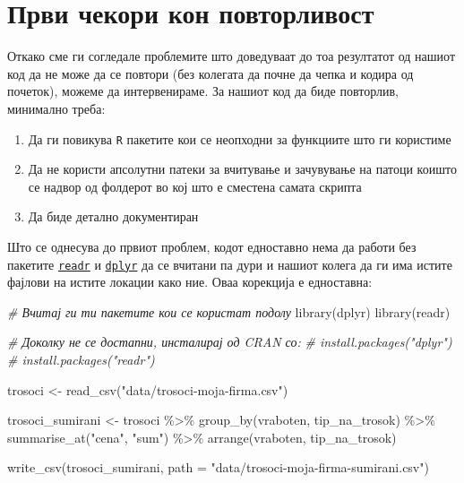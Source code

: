 \documentclass[
]{book}
\newenvironment{Shaded}{\begin{snugshade}}{\end{snugshade}}
\newcommand{\AttributeTok}[1]{\textcolor[rgb]{0.77,0.63,0.00}{#1}}
\newcommand{\CommentTok}[1]{\textcolor[rgb]{0.56,0.35,0.01}{\textit{#1}}}
\newcommand{\FunctionTok}[1]{\textcolor[rgb]{0.00,0.00,0.00}{#1}}
\newcommand{\NormalTok}[1]{#1}
\newcommand{\OtherTok}[1]{\textcolor[rgb]{0.56,0.35,0.01}{#1}}
\newcommand{\SpecialCharTok}[1]{\textcolor[rgb]{0.00,0.00,0.00}{#1}}
\newcommand{\StringTok}[1]{\textcolor[rgb]{0.31,0.60,0.02}{#1}}
\begin{document}
\hypertarget{ux43fux440ux432ux438-ux447ux435ux43aux43eux440ux438-ux43aux43eux43d-ux43fux43eux432ux442ux43eux440ux43bux438ux432ux43eux441ux442}{%
\section{Први чекори кон повторливост}\label{ux43fux440ux432ux438-ux447ux435ux43aux43eux440ux438-ux43aux43eux43d-ux43fux43eux432ux442ux43eux440ux43bux438ux432ux43eux441ux442}}

Откако сме ги согледале проблемите што доведуваат до тоа резултатот од нашиот код да не може да се повтори (без колегата да почне да чепка и кодира од почеток), можеме да интервенираме. За нашиот код да биде повторлив, минимално треба:

\begin{enumerate}
\def\labelenumi{\arabic{enumi}.}
\item
  Да ги повикува \texttt{R} пакетите кои се неопходни за функциите што ги користиме
\item
  Да не користи апсолутни патеки за вчитување и зачувување на патоци коишто се надвор од фолдерот во кој што е сместена самата скрипта
\item
  Да биде детално документиран
\end{enumerate}

Што се однесува до првиот проблем, кодот едноставно нема да работи без пакетите \href{https://www.rdocumentation.org/packages/readr/versions/1.3.1}{\texttt{readr}} \citep{R-readr} и \href{https://www.rdocumentation.org/packages/dplyr/versions/0.7.8}{\texttt{dplyr}} \citep{R-dplyr} да се вчитани па дури и нашиот колега да ги има истите фајлови на истите локации како ние. Оваа корекција е едноставна:

\begin{Shaded}
\begin{Highlighting}[]
\CommentTok{\# Вчитај ги ти пакетите кои се користат подолу }
\FunctionTok{library}\NormalTok{(dplyr)}
\FunctionTok{library}\NormalTok{(readr)}

\CommentTok{\# Доколку не се достапни, инсталирај од CRAN со:}
\CommentTok{\# install.packages("dplyr")}
\CommentTok{\# install.packages("readr")}

\NormalTok{trosoci }\OtherTok{\textless{}{-}} \FunctionTok{read\_csv}\NormalTok{(}\StringTok{"data/trosoci{-}moja{-}firma.csv"}\NormalTok{)}

\NormalTok{trosoci\_sumirani }\OtherTok{\textless{}{-}}\NormalTok{ trosoci }\SpecialCharTok{\%\textgreater{}\%} 
  \FunctionTok{group\_by}\NormalTok{(vraboten, tip\_na\_trosok) }\SpecialCharTok{\%\textgreater{}\%} 
  \FunctionTok{summarise\_at}\NormalTok{(}\StringTok{"cena"}\NormalTok{, }\StringTok{"sum"}\NormalTok{) }\SpecialCharTok{\%\textgreater{}\%} 
  \FunctionTok{arrange}\NormalTok{(vraboten, tip\_na\_trosok)}

\FunctionTok{write\_csv}\NormalTok{(trosoci\_sumirani, }
          \AttributeTok{path =} \StringTok{"data/trosoci{-}moja{-}firma{-}sumirani.csv"}\NormalTok{)}
\end{Highlighting}
\end{Shaded}
\end{document}
